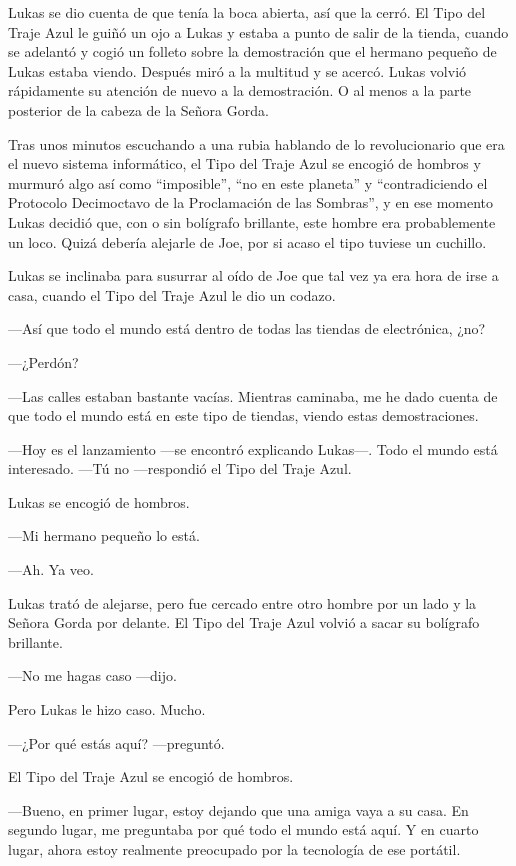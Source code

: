 Lukas se dio cuenta de que tenía la boca abierta, así que la cerró. El
Tipo del Traje Azul le guiñó un ojo a Lukas y estaba a punto de salir de
la tienda, cuando se adelantó y cogió un folleto sobre la demostración
que el hermano pequeño de Lukas estaba viendo. Después miró a la
multitud y se acercó. Lukas volvió rápidamente su atención de nuevo a la
demostración. O al menos a la parte posterior de la cabeza de la Señora
Gorda.

Tras unos minutos escuchando a una rubia hablando de lo revolucionario
que era el nuevo sistema informático, el Tipo del Traje Azul se encogió
de hombros y murmuró algo así como ``imposible'', ``no en este planeta''
y ``contradiciendo el Protocolo Decimoctavo de la Proclamación de las
Sombras'', y en ese momento Lukas decidió que, con o sin bolígrafo
brillante, este hombre era probablemente un loco. Quizá debería alejarle
de Joe, por si acaso el tipo tuviese un cuchillo.

Lukas se inclinaba para susurrar al oído de Joe que tal vez ya era hora
de irse a casa, cuando el Tipo del Traje Azul le dio un codazo.

---Así que todo el mundo está dentro de todas las tiendas de
electrónica, ¿no?

---¿Perdón?

---Las calles estaban bastante vacías. Mientras caminaba, me he dado
cuenta de que todo el mundo está en este tipo de tiendas, viendo estas
demostraciones.

---Hoy es el lanzamiento ---se encontró explicando Lukas---. Todo el
mundo está interesado. ---Tú no ---respondió el Tipo del Traje Azul.

Lukas se encogió de hombros.

---Mi hermano pequeño lo está.

---Ah. Ya veo.

Lukas trató de alejarse, pero fue cercado entre otro hombre por un lado
y la Señora Gorda por delante. El Tipo del Traje Azul volvió a sacar su
bolígrafo brillante.

---No me hagas caso ---dijo.

Pero Lukas le hizo caso. Mucho.

---¿Por qué estás aquí? ---preguntó.

El Tipo del Traje Azul se encogió de hombros.

---Bueno, en primer lugar, estoy dejando que una amiga vaya a su casa.
En segundo lugar, me preguntaba por qué todo el mundo está aquí. Y en
cuarto lugar, ahora estoy realmente preocupado por la tecnología de ese
portátil.

